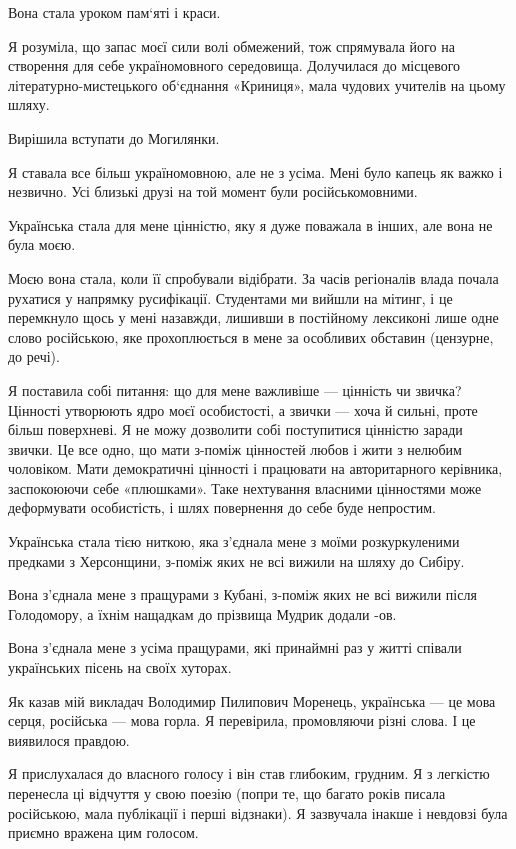 Вона стала уроком пам‘яті і краси.

Я розуміла, що запас моєї сили волі обмежений, тож спрямувала його на створення
для себе україномовного середовища. Долучилася до місцевого
літературно-мистецького об‘єднання «Криниця», мала чудових учителів на цьому
шляху. 

Вирішила вступати до Могилянки. 

Я ставала все більш україномовною, але не з усіма. Мені було капець як важко і
незвично. Усі близькі друзі на той момент були російськомовними.

Українська стала для мене цінністю, яку я дуже поважала в інших, але вона не
була моєю.

Моєю вона стала, коли її спробували відібрати. За часів регіоналів влада почала
рухатися у напрямку русифікації. Студентами ми вийшли на мітинг, і це
перемкнуло щось у мені назавжди, лишивши в постійному лексиконі лише одне слово
російською, яке прохоплюється в мене за особливих обставин (цензурне, до речі). 

Я поставила собі питання: що для мене важливіше — цінність чи звичка? Цінності
утворюють ядро моєї особистості, а звички — хоча й сильні, проте більш
поверхневі. Я не можу дозволити собі поступитися цінністю заради звички. Це все
одно, що мати з-поміж цінностей любов і жити з нелюбим чоловіком. Мати
демократичні цінності і працювати на авторитарного керівника, заспокоюючи себе
«плюшками». Таке нехтування власними цінностями може деформувати особистість, і
шлях повернення до себе буде непростим.

Українська стала тією ниткою, яка з’єднала мене з моїми розкуркуленими предками
з Херсонщини, з-поміж яких не всі вижили на шляху до Сибіру.

Вона з’єднала мене з пращурами з Кубані, з-поміж яких не всі вижили після
Голодомору, а їхнім нащадкам до прізвища Мудрик додали -ов.

Вона з’єднала мене з усіма пращурами, які принаймні раз у житті співали
українських пісень на своїх хуторах.

Як казав мій викладач Володимир Пилипович Моренець, українська — це мова серця,
російська — мова горла. Я перевірила, промовляючи різні слова. І це виявилося
правдою.

Я прислухалася  до власного голосу і він став глибоким, грудним. Я з легкістю
перенесла ці відчуття у свою поезію (попри те, що багато років писала
російською, мала публікації і перші відзнаки). Я зазвучала інакше і невдовзі
була приємно вражена цим голосом.

